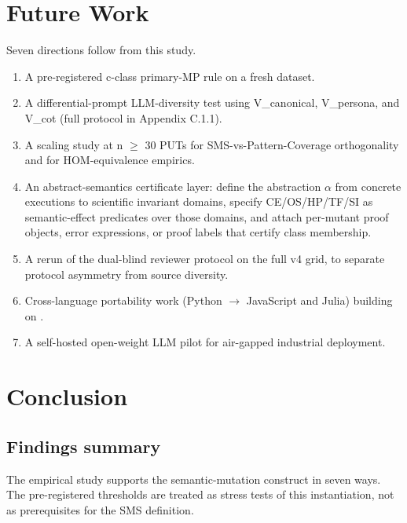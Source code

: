 \documentclass[12pt]{article}
\begin{document}

\section{Future Work}\label{future-work-and-p-series-roadmap}

Seven directions follow from this study.

\begin{enumerate}
\item
  A pre-registered c-class primary-MP rule on a fresh dataset.
\item
  A differential-prompt LLM-diversity test using V\_canonical,
  V\_persona, and V\_cot (full protocol in Appendix C.1.1).
\item
  A scaling study at n $\geq$ 30 PUTs for SMS-vs-Pattern-Coverage
  orthogonality and for HOM-equivalence empirics.
\item
  An abstract-semantics certificate layer: define the abstraction
  $\alpha$ from concrete executions to scientific invariant domains,
  specify CE/OS/HP/TF/SI as semantic-effect predicates over those
  domains, and attach per-mutant proof objects, error expressions, or
  proof labels that certify class membership.
\item
  A rerun of the dual-blind reviewer protocol on the full v4 grid, to
  separate protocol asymmetry from source diversity.
\item
  Cross-language portability work (Python $\to$ JavaScript and Julia)
  building on \citet{tip2025llmorpheus}.
\item
  A self-hosted open-weight LLM pilot for air-gapped industrial
  deployment.
\end{enumerate}



\section{Conclusion}\label{conclusion}

\subsection{Findings summary}\label{findings-summary}

The empirical study supports the semantic-mutation construct in seven
ways. The pre-registered thresholds are treated as stress tests of this
instantiation, not as prerequisites for the SMS definition.
\end{document}
